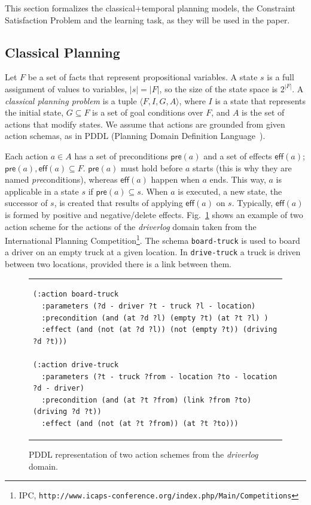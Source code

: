 \documentclass[runningheads]{llncs}
\newcommand{\tup}[1]{{\langle #1 \rangle}}
\newcommand{\pre}{\mathsf{pre}}    %
\newcommand{\eff}{\mathsf{eff}}    %
\begin{document}
This section formalizes the classical+temporal planning models, the Constraint Satisfaction Problem and the learning task, as they will be used in the paper.

\subsection{Classical Planning}
\label{sec:classicalplanning}
Let $F$ be a set of facts that represent propositional variables.
A state $s$ is a full assignment of values to variables, $|s|=|F|$, so the size of the state space is $2^{|F|}$.
A {\em classical planning problem} is a tuple $\tup{F,I,G,A}$, where $I$ is a state that represents the initial state, $G \subseteq F$ is a set of goal conditions over $F$, and $A$ is the set of actions that modify states. We assume that actions are grounded from given action schemas, as in PDDL (Planning Domain Definition Language~\cite{fox2003pddl2,Ghallab98,ghallab2004automated}).

Each action $a \in A$ has a set of preconditions $\pre(a)$ and a set of effects $\eff(a)$; $\pre(a), \eff(a) \subseteq F$. $\pre(a)$ must hold before $a$ starts (this is why they are named \emph{pre}conditions), whereas $\eff(a)$ happen when $a$ ends. This way, $a$ is applicable in a state $s$ if $\pre(a) \subseteq s$. When $a$ is executed, a new state, the successor of $s$, is created that results of applying $\eff(a)$ on $s$. Typically, $\eff(a)$ is formed by positive and negative/delete effects. Fig.~\ref{fig:exampleactions1} shows an example of two action scheme for the actions of the \emph{driverlog} domain taken from the International Planning Competition\footnote{IPC, \texttt{http://www.icaps-conference.org/index.php/Main/Competitions}}. The schema \texttt{board-truck} is used to board a driver on an empty truck at a given location. In \texttt{drive-truck} a truck is driven between two locations, provided there is a link between them.

\begin{figure}
\begin{tabular}{p{\textwidth}}
\begin{verbatim}
(:action board-truck
  :parameters (?d - driver ?t - truck ?l - location)
  :precondition (and (at ?d ?l) (empty ?t) (at ?t ?l) )
  :effect (and (not (at ?d ?l)) (not (empty ?t)) (driving ?d ?t)))

(:action drive-truck
  :parameters (?t - truck ?from - location ?to - location ?d - driver)
  :precondition (and (at ?t ?from) (link ?from ?to) (driving ?d ?t))
  :effect (and (not (at ?t ?from)) (at ?t ?to)))
\end{verbatim}
\end{tabular}
\caption{\small PDDL representation of two action schemes from the {\em driverlog} domain.}
\label{fig:exampleactions1}
\end{figure}
\end{document}

